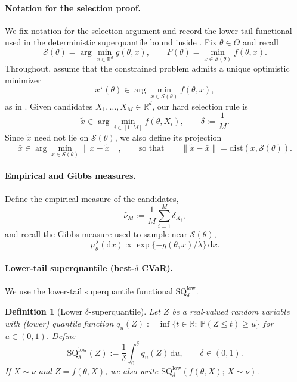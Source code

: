 \documentclass{article}
\def\d{\delta}
\theoremstyle{normaltheorem}
\newtheorem{definition}[definition]{Definition}
\newcommand{\gibbs}{\mu}
\newcommand{\R}{\mathbb{R}}
\newcommand{\calS}{\mathcal{S}}
\renewcommand{\d}{\mathrm{d}}
\begin{document}
\paragraph{Notation for the selection proof.}
We fix notation for the selection argument and record the lower-tail functional used in the deterministic superquantile bound inside .
Fix $\theta\in\Theta$ and recall
\[
\calS(\theta)=\arg\min_{x\in\R^d} g(\theta,x),\qquad
F(\theta)=\min_{x\in\calS(\theta)} f(\theta,x).
\]
Throughout, assume that the constrained problem admits a unique optimistic minimizer
\[
x^\star(\theta)\in\arg\min_{x\in\calS(\theta)} f(\theta,x),
\]
as in . Given candidates $X_1,\dots,X_M\in\R^d$, our hard selection rule is
\[
\tilde x \in \arg\min_{i\in[1:M]} f(\theta,X_i),
\qquad
\delta:=\frac1M.
\]
Since $\tilde x$ need not lie on $\calS(\theta)$, we also define its projection
\[
\bar x \in \arg\min_{x\in\calS(\theta)}\|x-\tilde x\|,
\qquad\text{so that}\qquad
\|\tilde x-\bar x\|=\mathrm{dist}(\tilde x,\calS(\theta)).
\]

\paragraph{Empirical and Gibbs measures.}
Define the empirical measure of the candidates,
\[
\widehat\nu_M := \frac1M\sum_{i=1}^M \delta_{X_i},
\]
and recall the Gibbs measure used to sample near $\calS(\theta)$,
\[
\gibbs_\theta^\lambda(\d x)\propto \exp\{-g(\theta,x)/\lambda\}\,\d x.
\]

\paragraph{Lower-tail superquantile (best-$\delta$ CVaR).}
We use the lower-tail superquantile functional $\mathrm{SQ}^{\mathrm{low}}_\delta$.

\begin{definition}[Lower $\delta$-superquantile]\label{def:lower-sq}
Let $Z$ be a real-valued random variable with (lower) quantile function
$q_u(Z):=\inf\{t\in\R:\ \mathbb{P}(Z\le t)\ge u\}$ for $u\in(0,1)$.
Define
\[
\mathrm{SQ}^{\mathrm{low}}_\delta(Z):=\frac1\delta\int_0^\delta q_u(Z)\,\d u,
\qquad \delta\in(0,1).
\]
If $X\sim \nu$ and $Z=f(\theta,X)$, we also write
$\mathrm{SQ}^{\mathrm{low}}_\delta(f(\theta,X);\,X\sim\nu)$.
\end{definition}
\end{document}

